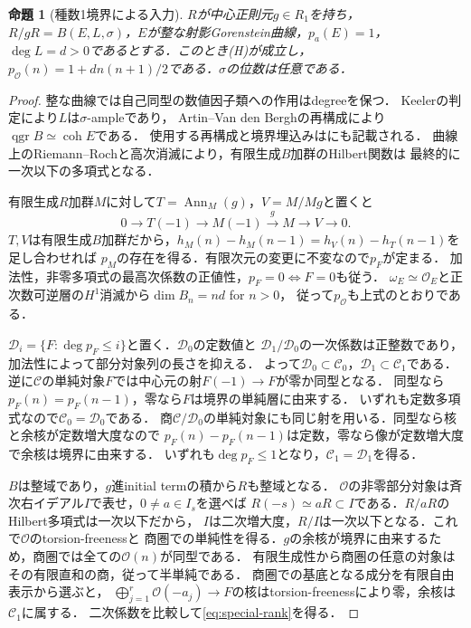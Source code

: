\documentclass[11pt,a4paper]{ltjsarticle}
\newtheorem{proposition}[theorem]{命題}
\theoremstyle{definition}
\newcommand{\OO}{\mathcal O}
\newcommand{\CC}{\mathcal C}
\newcommand{\DD}{\mathcal D}
\newcommand{\qgr}{\operatorname{qgr}}
\newcommand{\coh}{\operatorname{coh}}
\begin{document}
\begin{proposition}[種数1境界による入力]\label{prop:field-input}
$R$が中心正則元$g\in R_1$を持ち，
$R/gR=B(E,L,\sigma)$，$E$が整な射影Gorenstein曲線，$p_a(E)=1$，
$\deg L=d>0$であるとする．このとき\textup{(H)}が成立し，
$p_{\OO}(n)=1+dn(n+1)/2$である．$\sigma$の位数は任意である．
\end{proposition}
\begin{proof}
整な曲線では自己同型の数値因子類への作用はdegreeを保つ．
Keeler\cite[Theorem 1.2]{Keeler}の判定により$L$は$\sigma$-ampleであり，
Artin--Van den Berghの再構成\cite{AV}により$\qgr B\simeq\coh E$である．
使用する再構成と境界埋込みは\cite[Theorem 2.4, Corollary 2.8]{CKS}にも記載される．
曲線上のRiemann--Rochと高次消滅により，有限生成$B$加群のHilbert関数は
最終的に一次以下の多項式となる．

有限生成$R$加群$M$に対して$T=\operatorname{Ann}_M(g)$，$V=M/Mg$と置くと
\[
 0\longrightarrow T(-1)\longrightarrow M(-1)\xrightarrow{g}M
 \longrightarrow V\longrightarrow0.
\]
$T,V$は有限生成$B$加群だから，$h_M(n)-h_M(n-1)=h_V(n)-h_T(n-1)$を足し合わせれば
$p_M$の存在を得る．有限次元の変更に不変なので$p_F$が定まる．
加法性，非零多項式の最高次係数の正値性，$p_F=0\Leftrightarrow F=0$も従う．
$\omega_E\simeq\OO_E$と正次数可逆層の$H^1$消滅から$\dim B_n=nd$ for $n>0$，
従って$p_{\OO}$も上式のとおりである．

$\DD_i=\{F:\deg p_F\leq i\}$と置く．$\DD_0$の定数値と
$\DD_1/\DD_0$の一次係数は正整数であり，加法性によって部分対象列の長さを抑える．
よって$\DD_0\subset\CC_0$，$\DD_1\subset\CC_1$である．
逆に$\CC$の単純対象$F$では中心元の射$F(-1)\to F$が零か同型となる．
同型なら$p_F(n)=p_F(n-1)$，零なら$F$は境界の単純層に由来する．
いずれも定数多項式なので$\CC_0=\DD_0$である．
商$\CC/\DD_0$の単純対象にも同じ射を用いる．同型なら核と余核が定数増大度なので
$p_F(n)-p_F(n-1)$は定数，零なら像が定数増大度で余核は境界に由来する．
いずれも$\deg p_F\leq1$となり，$\CC_1=\DD_1$を得る．

$B$は整域であり，$g$進initial termの積から$R$も整域となる．
$\OO$の非零部分対象は斉次右イデアル$I$で表せ，$0\ne a\in I_s$を選べば
$R(-s)\simeq aR\subset I$である．$R/aR$のHilbert多項式は一次以下だから，
$I$は二次増大度，$R/I$は一次以下となる．これで$\OO$のtorsion-freenessと
商圏での単純性を得る．$g$の余核が境界に由来するため，商圏では全ての$\OO(n)$が同型である．
有限生成性から商圏の任意の対象はその有限直和の商，従って半単純である．
商圏での基底となる成分を有限自由表示から選ぶと，
$\bigoplus_{j=1}^r\OO(-a_j)\to F$の核はtorsion-freenessにより零，余核は$\CC_1$に属する．
二次係数を比較して\eqref{eq:special-rank}を得る．
\end{proof}
\end{document}
